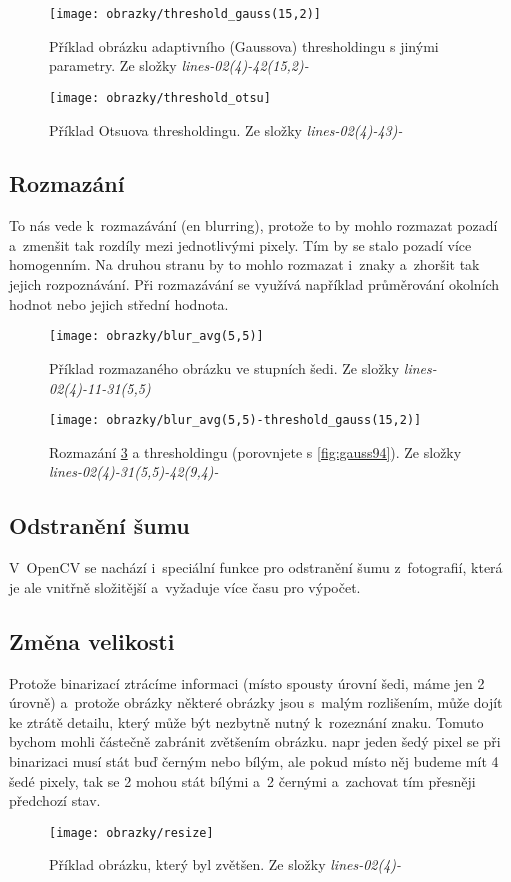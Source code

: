 \documentclass[12pt,oneside]{report}			%
\begin{document}
	\begin{figure}[h!]
	\texttt{[image: obrazky/threshold\_gauss(15,2)]}
	\centering
	\caption{Příklad obrázku adaptivního (Gaussova) thresholdingu s jinými parametry. Ze složky \emph{lines-02(4)-42(15,2)-}}
	\label{fig:gauss152}
	\end{figure}
	
		\begin{figure}[h!]
	\texttt{[image: obrazky/threshold\_otsu]}
	\centering
	\caption{Příklad Otsuova thresholdingu. Ze složky \emph{lines-02(4)-43)-}}
	\label{fig:otsu}
	\end{figure}
	
	\subsection{Rozmazání}
	To nás vede k~rozmazávání (\gls{en} blurring), protože to by mohlo rozmazat pozadí a~zmenšit tak rozdíly mezi jednotlivými pixely. Tím by se stalo pozadí více homogenním. Na druhou stranu by to mohlo rozmazat i~znaky a~zhoršit tak jejich rozpoznávání. Při rozmazávání se využívá například průměrování okolních hodnot nebo jejich střední hodnota.
	\begin{figure}[h]
	\texttt{[image: obrazky/blur\_avg(5,5)]}
	\centering
	\caption{Příklad rozmazaného obrázku ve stupních šedi. Ze složky \emph{lines-02(4)-11-31(5,5)}}
	\label{fig:blur}
	\end{figure}
	
	\begin{figure}[h!]
	\texttt{[image: obrazky/blur\_avg(5,5)-threshold\_gauss(15,2)]}
	\centering
	\caption{Rozmazání \ref{fig:blur} a thresholdingu (porovnjete s \ref{fig:gauss94}). Ze složky \emph{lines-02(4)-31(5,5)-42(9,4)-}}
	\label{fig:blur_gauss}
	\end{figure}
	\subsection{Odstranění šumu}
	V~OpenCV se nachází i~speciální funkce pro odstranění šumu z~fotografií, která je ale vnitřně složitější a~vyžaduje více času pro výpočet.
	\subsection{Změna velikosti}
	Protože binarizací ztrácíme informaci (místo spousty úrovní šedi, máme jen 2 úrovně) a~protože obrázky některé obrázky jsou s~malým rozlišením, může dojít ke ztrátě detailu, který může být nezbytně nutný k~rozeznání znaku. Tomuto bychom mohli částečně zabránit zvětšením obrázku. \Gls{napr} jeden šedý pixel se při binarizaci musí stát buď černým nebo bílým, ale pokud místo něj budeme mít 4 šedé pixely, tak se 2 mohou stát bílými a~2 černými a~zachovat tím přesněji předchozí stav.
	\begin{figure}[h!]
	\texttt{[image: obrazky/resize]}
	\centering
	\caption{Příklad obrázku, který byl zvětšen. Ze složky \emph{lines-02(4)-}}
	\label{fig:resize}
	\end{figure}
\end{document}
